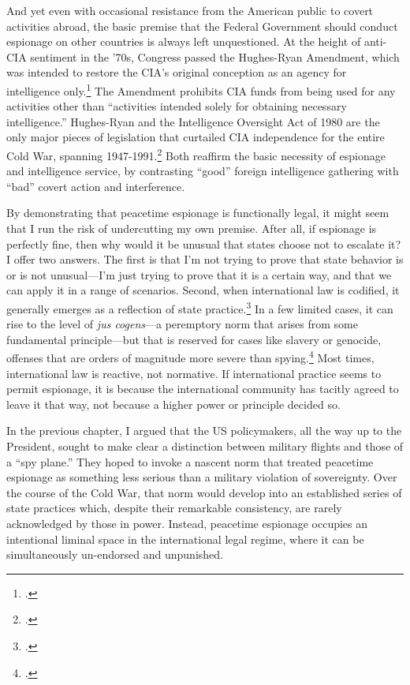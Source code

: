 \documentclass[12pt]{article}
\begin{document}
And yet even with occasional resistance from the American public to covert activities abroad, the basic premise that the Federal Government should conduct espionage on other countries is always left unquestioned. At the height of anti-CIA sentiment in the '70s, Congress passed the Hughes-Ryan Amendment, which was intended to restore the CIA's original conception as an agency for intelligence only.\footcite[p.~215]{andrew_missing_1984} The Amendment prohibits CIA funds from being used for any activities other than ``activities intended solely for obtaining necessary intelligence.'' Hughes-Ryan and the Intelligence Oversight Act of 1980 are the only major pieces of legislation that curtailed CIA independence for the entire Cold War, spanning 1947-1991.\footcite[p.~93-94]{cogan_covert_1993} Both reaffirm the basic necessity of espionage and intelligence service, by contrasting ``good'' foreign intelligence gathering with ``bad'' covert action and interference.

By demonstrating that peacetime espionage is functionally legal, it might seem that I run the risk of undercutting my own premise. After all, if espionage is perfectly fine, then why would it be unusual that states choose not to escalate it? I offer two answers. The first is that I'm not trying to prove that state behavior is or is not unusual---I'm just trying to prove that it is a certain way, and that we can apply it in a range of scenarios. Second, when international law is codified, it generally emerges as a reflection of state practice.\footcite[p.~628]{sulmasy_counterintuitive_2007} In a few limited cases, it can rise to the level of \emph{jus cogens}---a peremptory norm that arises from some fundamental principle---but that is reserved for cases like slavery or genocide, offenses that are orders of magnitude more severe than spying.\footcite[p.~629]{sulmasy_counterintuitive_2007} Most times, international law is reactive, not normative. If international practice seems to permit espionage, it is because the international community has tacitly agreed to leave it that way, not because a higher power or principle decided so.

In the previous chapter, I argued that the US policymakers, all the way up to the President, sought to make clear a distinction between military flights and those of a ``spy plane.'' They hoped to invoke a nascent norm that treated peacetime espionage as something less serious than a military violation of sovereignty. Over the course of the Cold War, that norm would develop into an established series of state practices which, despite their remarkable consistency, are rarely acknowledged by those in power. Instead, peacetime espionage occupies an intentional liminal space in the international legal regime, where it can be simultaneously un-endorsed and unpunished.
\end{document}
